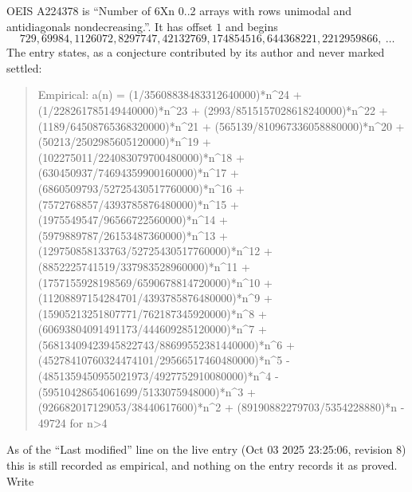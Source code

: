 \documentclass[11pt,a4paper]{article}
\theoremstyle{plain}
\theoremstyle{definition}
\begin{document}
OEIS A224378 is ``Number of 6Xn 0..2 arrays with rows unimodal and antidiagonals nondecreasing.''. It has offset $1$ and begins
\[
729, 69984, 1126072, 8297747, 42132769, 174854516, 644368221, 2212959866,\ \dots
\]
The entry states, as a conjecture contributed by its author and never marked settled:
\begin{quote}\raggedright\small
Empirical: a(n) = (1/35608838483312640000)*n\^{}24 + (1/228261785149440000)*n\^{}23 + (2993/8515157028618240000)*n\^{}22 + (1189/64508765368320000)*n\^{}21 + (565139/810967336058880000)*n\^{}20 + (50213/2502985605120000)*n\^{}19 + (102275011/224083079700480000)*n\^{}18 + (630450937/74694359900160000)*n\^{}17 + (6860509793/52725430517760000)*n\^{}16 + (7572768857/4393785876480000)*n\^{}15 + (1975549547/96566722560000)*n\^{}14 + (5979889787/26153487360000)*n\^{}13 + (129750858133763/52725430517760000)*n\^{}12 + (8852225741519/337983528960000)*n\^{}11 + (1757155928198569/6590678814720000)*n\^{}10 + (11208897154284701/4393785876480000)*n\^{}9 + (15905213251807771/762187345920000)*n\^{}8 + (60693804091491173/444609285120000)*n\^{}7 + (56813409423945822743/88699552381440000)*n\^{}6 + (45278410760324474101/29566517460480000)*n\^{}5 - (4851359450955021973/4927752910080000)*n\^{}4 - (59510428654061699/5133075948000)*n\^{}3 + (926682017129053/38440617600)*n\^{}2 + (89190882279703/5354228880)*n - 49724 for n>4
\end{quote}
As of the ``Last modified'' line on the live entry (Oct 03 2025 23:25:06, revision 8) this is still
recorded as empirical, and nothing on the entry records it as proved. Write
\end{document}
